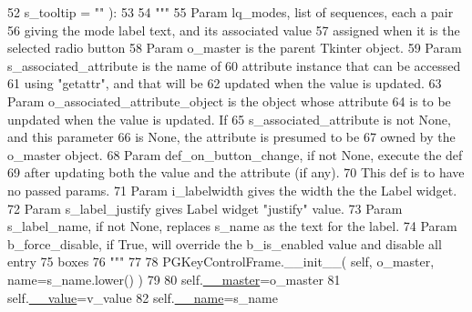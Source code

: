 \begin{DoxyCode}
52             s\_tooltip = \textcolor{stringliteral}{""} ):
53 
54         \textcolor{stringliteral}{"""}
55 \textcolor{stringliteral}{        Param lq\_modes, list of sequences, each a pair}
56 \textcolor{stringliteral}{            giving the mode label text, and its associated value}
57 \textcolor{stringliteral}{            assigned when it is the selected radio button}
58 \textcolor{stringliteral}{        Param o\_master is the parent Tkinter object.}
59 \textcolor{stringliteral}{                Param s\_associated\_attribute is the name of }
60 \textcolor{stringliteral}{            attribute instance that can be accessed}
61 \textcolor{stringliteral}{            using "getattr", and that will be}
62 \textcolor{stringliteral}{            updated when the value is updated.}
63 \textcolor{stringliteral}{        Param o\_associated\_attribute\_object is the object whose attribute}
64 \textcolor{stringliteral}{            is to be unpdated when the value is updated.  If}
65 \textcolor{stringliteral}{            s\_associated\_attribute is not None, and this parameter}
66 \textcolor{stringliteral}{            is None, the attribute is presumed to be}
67 \textcolor{stringliteral}{            owned by the o\_master object.}
68 \textcolor{stringliteral}{        Param def\_on\_button\_change, if not None, execute the def}
69 \textcolor{stringliteral}{            after updating both the value and the attribute (if any).}
70 \textcolor{stringliteral}{            This def is to have no passed params.}
71 \textcolor{stringliteral}{        Param i\_labelwidth gives the width the the Label widget.}
72 \textcolor{stringliteral}{        Param s\_label\_justify gives Label widget "justify" value.}
73 \textcolor{stringliteral}{        Param s\_label\_name, if not None, replaces s\_name as the text for the label.}
74 \textcolor{stringliteral}{        Param b\_force\_disable, if True, will override the b\_is\_enabled value and disable all entry }
75 \textcolor{stringliteral}{              boxes}
76 \textcolor{stringliteral}{        """}
77 
78         PGKeyControlFrame.\_\_init\_\_( self, o\_master, name=s\_name.lower() )
79 
80         self.\hyperlink{classnegui_1_1pgkeycheckboxvalueframe_1_1KeyCheckboxValueFrame_a90a6f743626f7dd0711dd3cc9f23fc05}{\_\_master}=o\_master
81         self.\hyperlink{classnegui_1_1pgkeycheckboxvalueframe_1_1KeyCheckboxValueFrame_a295bcfc16e29aec1d1c2b16b7c18ac94}{\_\_value}=v\_value
82         self.\hyperlink{classnegui_1_1pgkeycheckboxvalueframe_1_1KeyCheckboxValueFrame_a93336ce9b80c39f842e505b1b1be5873}{\_\_name}=s\_name

\end{DoxyCode}
